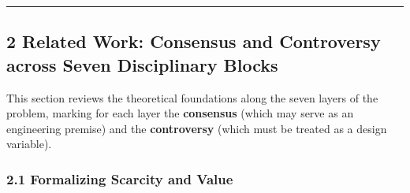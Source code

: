 \documentclass[
  11pt]{article}
\begin{document}
\begin{center}\rule{0.5\linewidth}{0.5pt}\end{center}

\subsection{2 Related Work: Consensus and Controversy across Seven
Disciplinary
Blocks}\label{related-work-consensus-and-controversy-across-seven-disciplinary-blocks}

This section reviews the theoretical foundations along the seven layers
of the problem, marking for each layer the \textbf{consensus} (which may
serve as an engineering premise) and the \textbf{controversy} (which
must be treated as a design variable).

\subsubsection{2.1 Formalizing Scarcity and
Value}\label{formalizing-scarcity-and-value}
\end{document}
